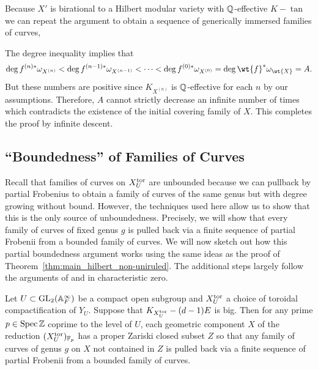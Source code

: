 \documentclass[main.tex]{subfiles}
\begin{document}
{Because $X'$ is birational to a Hilbert modular variety with $\mathbb{Q}$-effective $K - \tan$ we can repeat the argument to obtain a sequence of generically immersed families of curves,
\begin{center}
\end{center}
The degree inequality implies that 
\[ \deg{f^{(n)*} \omega_{X^{(n)}}} < \deg{f^{(n-1)*} \omega_{X^{(n-1)}}} < \cdots < \deg{f^{(0)*} \omega_{X^{(0)}}} = \deg{\wt{f}^* \omega_{\wt{X}}} = A. \]
But these numbers are positive since $K_{X^{(n)}}$ is $\mathbb{Q}$-effective for each $n$ by our assumptions. Therefore, $A$ cannot strictly decrease an infinite number of times which contradicts the existence of the initial covering family of $X$. This completes the proof by infinite descent. 

\subsection{``Boundedness'' of Families of Curves} \label{section:boundedness_of_families_of_curves}

Recall that families of curves on $X_U^{\mathrm{tor}}$ are unbounded because we can pullback by partial Frobenius to obtain a family of curves of the same genus but with degree growing without bound. However, the techniques used here allow us to show that this is the only source of unboundedness. Precisely, we will show that every family of curves of fixed genus $g$ is pulled back via a finite sequence of partial Frobenii from a bounded family of curves. We will now sketch out how this partial boundedness argument works using the same ideas as the proof of Theorem~\ref{thm:main_hilbert_non-uniruled}. The additional steps largely follow the arguments of \cite{lang_product_quotient} and \cite{rousseau:curves_hilbert_modular} in characteristic zero.

\begin{theorem} \label{thm:hilbert_boundedness_of_curves}
Let $U \subset \mathrm{GL}_2(\mathbb{A}_F^{\infty})$ be a compact open subgroup and $X_U^{\mathrm{tor}}$ a choice of toroidal compactification of $Y_U$. Suppose that $K_{X_U^{\mathrm{tor}}} - (d-1) E$ is big. Then for any prime $p \in \operatorname{\mathrm{Spec}}{\mathbb{Z}}$ coprime to the level of $U$, each geometric component $X$ of the reduction $(X_U^{\mathrm{tor}})_{\mathbb{F}_p}$ has a proper Zariski closed subset $Z$ so that any family of curves of genus $g$ on $X$ not contained in $Z$ is pulled back via a finite sequence of partial Frobenii from a bounded family of curves.
\end{theorem}

}
\end{document}
